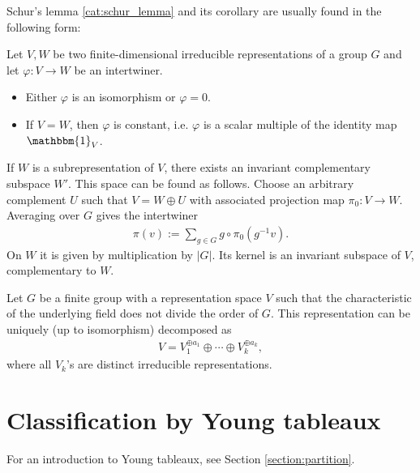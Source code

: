    Schur's lemma \ref{cat:schur_lemma} and its corollary are usually found in the following form:
    \begin{theorem}\label{rep:schurs_lemma}
        Let $V,W$ be two finite-dimensional irreducible representations of a group $G$ and let $\varphi:V\rightarrow W$ be an intertwiner.
        \begin{itemize}
            \item Either $\varphi$ is an isomorphism or $\varphi=0$.
            \item If $V=W$, then $\varphi$ is constant, i.e. $\varphi$ is a scalar multiple of the identity map $\mathbbm{1}_V$.
        \end{itemize}
    \end{theorem}

    \begin{property}
        If $W$ is a subrepresentation of $V$, there exists an invariant complementary subspace $W'$. This space can be found as follows. Choose an arbitrary complement $U$ such that $V=W \oplus U$ with associated projection map $\pi_0:V \rightarrow W$. Averaging over $G$ gives the intertwiner
        \begin{gather}
            \pi(v) := \sum_{g\in G}g\circ\pi_0(g^{-1}v).
        \end{gather}
        On $W$ it is given by multiplication by $|G|$. Its kernel is an invariant subspace of $V$, complementary to $W$.
    \end{property}
    \begin{theorem}[Maschke]
        Let $G$ be a finite group with a representation space $V$ such that the characteristic of the underlying field does not divide the order of $G$. This representation can be uniquely (up to isomorphism) decomposed as
        \begin{gather}
            V = V_1^{\oplus a_1}\oplus\cdots\oplus V_k^{\oplus a_k},
        \end{gather}
        where all $V_k$'s are distinct irreducible representations.
    \end{theorem}

\section{Classification by Young tableaux}

    For an introduction to Young tableaux, see Section \ref{section:partition}.

